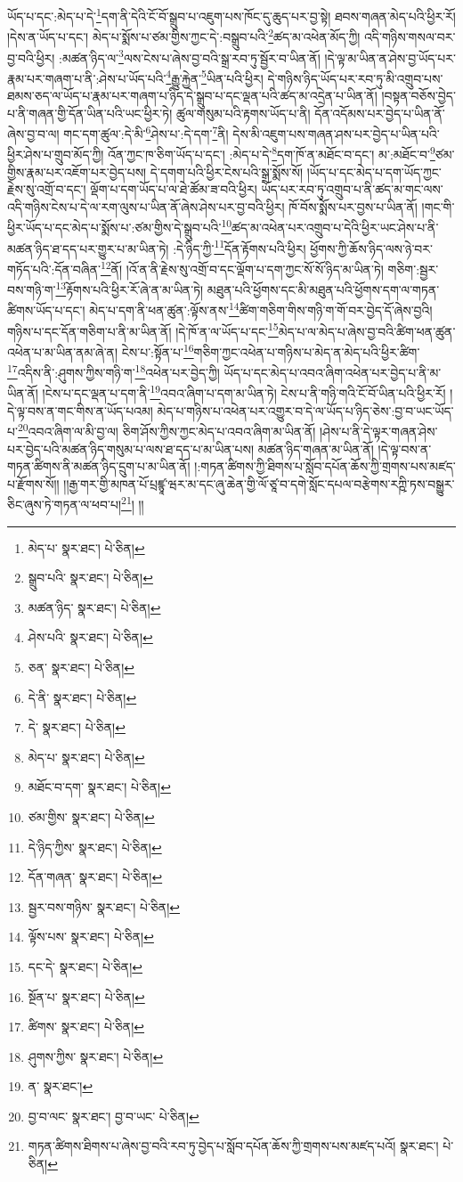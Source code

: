 ཡོད་པ་དང་:མེད་པ་དེ་\footnote{མེད་པ་  སྣར་ཐང་།  པེ་ཅིན། }དག་ནི་དེའི་ངོ་བོ་སྒྲུབ་པ་འཇུག་པས་ཁོང་དུ་ཆུད་པར་བྱ་སྟེ། ཐབས་གཞན་མེད་པའི་ཕྱིར་རོ། །དེས་ན་ཡོད་པ་དང་། མེད་པ་སྨོས་པ་ཙམ་གྱིས་ཀྱང་དེ་:བསྒྲུབ་པའི་\footnote{སྒྲུབ་པའི་  སྣར་ཐང་།  པེ་ཅིན། }ཚད་མ་འཕེན་མོད་ཀྱི། འདི་གཉིས་གསལ་བར་བྱ་བའི་ཕྱིར། :མཚན་ཉིད་ལ་\footnote{མཚན་ཉིད་  སྣར་ཐང་།  པེ་ཅིན། }ལས་ངེས་པ་ཞེས་བྱ་བའི་སྒྲ་རབ་ཏུ་སྦྱོར་བ་ཡིན་ནོ། །དེ་ལྟ་མ་ཡིན་ན་ཤེས་བྱ་ཡོད་པར་རྣམ་པར་གཞག་པ་ནི་:ཤེས་པ་ཡོད་པའི་\footnote{ཤེས་པའི་  སྣར་ཐང་།  པེ་ཅིན། }རྒྱུ་རྐྱེན་\footnote{ཅན་  སྣར་ཐང་།  པེ་ཅིན། }ཡིན་པའི་ཕྱིར། དེ་གཉིས་ཉིད་ཡོད་པར་རབ་ཏུ་མི་འགྲུབ་པས་ཐམས་ཅད་ལ་ཡོད་པ་རྣམ་པར་གཞག་པ་ཉིད་དེ་སྒྲུབ་པ་དང་ལྡན་པའི་ཚད་མ་འདྲེན་པ་ཡིན་ནོ། །བསྟན་བཅོས་བྱེད་པ་ནི་གཞན་གྱི་དོན་ཡིན་པའི་ཡང་ཕྱིར་ཏེ། ཚུལ་གསུམ་པའི་རྟགས་ཡོད་པ་ནི། དོན་འདོམས་པར་བྱེད་པ་ཡིན་ནོ་ཞེས་བྱ་བ་ལ། གང་དག་ཚུལ་:དེ་མི་\footnote{དེ་ནི་  སྣར་ཐང་།  པེ་ཅིན། }ཤེས་པ་:དེ་དག་\footnote{དེ་  སྣར་ཐང་།  པེ་ཅིན། }ནི། དེས་མི་འཇུག་པས་གཞན་ཤས་པར་བྱེད་པ་ཡིན་པའི་ཕྱིར་ཤེས་པ་གྲུབ་མོད་ཀྱི། འོན་ཀྱང་ཁ་ཅིག་ཡོད་པ་དང་། :མེད་པ་དེ་\footnote{མེད་པ་  སྣར་ཐང་།  པེ་ཅིན། }དག་ཁོ་ན་མཐོང་བ་དང་། མ་:མཐོང་བ་\footnote{མཐོང་བ་དག་  སྣར་ཐང་།  པེ་ཅིན། }ཙམ་གྱིས་རྣམ་པར་འཇོག་པར་བྱེད་པས། དེ་དགག་པའི་ཕྱིར་ངེས་པའི་སྒྲ་སྨོས་སོ། །ཡོད་པ་དང་མེད་པ་དག་ཡོད་ཀྱང་རྗེས་སུ་འགྲོ་བ་དང་། ལྡོག་པ་དག་ཡོད་པ་ལ་ཐེ་ཚོམ་ཟ་བའི་ཕྱིར། ཡོད་པར་རབ་ཏུ་འགྲུབ་པ་ནི་ཚད་མ་གང་ལས་འདི་གཉིས་ངེས་པ་དེ་ལ་རག་ལུས་པ་ཡིན་ནོ་ཞེས་ཤེས་པར་བྱ་བའི་ཕྱིར། ཁོ་བོས་སྨོས་པར་བྱས་པ་ཡིན་ནོ། །གང་གི་ཕྱིར་ཡོད་པ་དང་མེད་པ་སྨོས་པ་:ཙམ་གྱིས་དེ་སྒྲུབ་པའི་\footnote{ཙམ་གྱིས་  སྣར་ཐང་།  པེ་ཅིན། }ཚད་མ་འཕེན་པར་འགྲུབ་པ་དེའི་ཕྱིར་ཡང་ཤེས་པ་ནི་མཚན་ཉིད་ཐ་དད་པར་གྱུར་པ་མ་ཡིན་ཏེ། :དེ་ཉིད་ཀྱི་\footnote{དེ་ཉིད་ཀྱིས་  སྣར་ཐང་།  པེ་ཅིན། }དོན་རྟོགས་པའི་ཕྱིར། ཕྱོགས་ཀྱི་ཆོས་ཉིད་ལས་ཉེ་བར་གཏོད་པའི་:དོན་བཞིན་\footnote{དོན་གཞན་  སྣར་ཐང་།  པེ་ཅིན། }ནོ། །འོ་ན་ནི་རྗེས་སུ་འགྲོ་བ་དང་ལྡོག་པ་དག་ཀྱང་སོ་སོ་ཉིད་མ་ཡིན་ཏེ། གཅིག་:སྦྱར་བས་གཉི་ག་\footnote{སྦྱར་བས་གཉིས་  སྣར་ཐང་།  པེ་ཅིན། }རྟོགས་པའི་ཕྱིར་རོ་ཞེ་ན་མ་ཡིན་ཏེ། མཐུན་པའི་ཕྱོགས་དང་མི་མཐུན་པའི་ཕྱོགས་དག་ལ་གཏན་ཚིགས་ཡོད་པ་དང་། མེད་པ་དག་ནི་ཕན་ཚུན་:ལྟོས་ནས་\footnote{ལྟོས་པས་  སྣར་ཐང་།  པེ་ཅིན། }ཚིག་གཅིག་གིས་གཉི་ག་གོ་བར་བྱེད་དོ་ཞེས་བྱའི། གཉིས་པ་དང་དོན་གཅིག་པ་ནི་མ་ཡིན་ནོ། །དེ་ཁོ་ན་ལ་ཡོད་པ་དང་\footnote{དང་དེ་  སྣར་ཐང་།  པེ་ཅིན། }མེད་པ་ལ་མེད་པ་ཞེས་བྱ་བའི་ཚིག་ཕན་ཚུན་འཕེན་པ་མ་ཡིན་ནམ་ཞེ་ན། ངེས་པ་:སྟོན་པ་\footnote{སྔོན་པ་  སྣར་ཐང་།  པེ་ཅིན། }གཅིག་ཀྱང་འཕེན་པ་གཉིས་པ་མེད་ན་མེད་པའི་ཕྱིར་ཚིག་\footnote{ཚིགས་  སྣར་ཐང་།  པེ་ཅིན། }འདིས་ནི་:ཤུགས་ཀྱིས་གཉི་ག་\footnote{ཤུགས་ཀྱིས་  སྣར་ཐང་།  པེ་ཅིན། }འཕེན་པར་བྱེད་ཀྱི། ཡོད་པ་དང་མེད་པ་འབའ་ཞིག་འཕེན་པར་བྱེད་པ་ནི་མ་ཡིན་ནོ། །ངེས་པ་དང་ལྡན་པ་དག་ནི་\footnote{ན་  སྣར་ཐང་། }འབའ་ཞིག་པ་དག་མ་ཡིན་ཏེ། ངེས་པ་ནི་གཉི་གའི་ངོ་བོ་ཡིན་པའི་ཕྱིར་རོ། །དེ་ལྟ་བས་ན་གང་གིས་ན་ཡོད་པའམ། མེད་པ་གཉིས་པ་འཕེན་པར་འགྱུར་བ་དེ་ལ་ཡོད་པ་ཉིད་ཅེས་:བྱ་བ་ཡང་ཡོད་པ་\footnote{བྱ་བ་ལང་  སྣར་ཐང་། བྱ་བ་ཡང་  པེ་ཅིན། }འབའ་ཞིག་ལ་མི་བྱ་ལ། ཅིག་ཤོས་ཀྱིས་ཀྱང་མེད་པ་འབའ་ཞིག་མ་ཡིན་ནོ། །ཤེས་པ་ནི་དེ་ལྟར་གཞན་ཤེས་པར་བྱེད་པའི་མཚན་ཉིད་གསུམ་པ་ལས་ཐ་དད་པ་མ་ཡིན་པས། མཚན་ཉིད་གཞན་མ་ཡིན་ནོ། །དེ་ལྟ་བས་ན་གཏན་ཚིགས་ནི་མཚན་ཉིད་དྲུག་པ་མ་ཡིན་ནོ། །:གཏན་ཚིགས་ཀྱི་ཐིགས་པ་སློབ་དཔོན་ཆོས་ཀྱི་གྲགས་པས་མཛད་པ་རྫོགས་སོ།། །།རྒྱ་གར་གྱི་མཁན་པོ་པྲཛྙཱ་ཝར་མ་དང་ཞུ་ཆེན་གྱི་ལོ་ཙཱ་བ་དགེ་སློང་དཔལ་བརྩེགས་རཀྵི་ཏས་བསྒྱུར་ཅིང་ཞུས་ཏེ་གཏན་ལ་ཕབ་པ།\footnote{གཏན་ཚིགས་ཐིགས་པ་ཞེས་བྱ་བའི་རབ་ཏུ་བྱེད་པ་སློབ་དཔོན་ཆོས་ཀྱི་གྲགས་པས་མཛད་པའོ།  སྣར་ཐང་།  པེ་ཅིན། }། །།